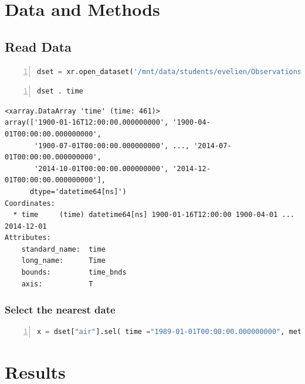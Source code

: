 \documentclass[10pt,parskip=half,
	toc=sectionentrywithdots,
	bibliography=totocnumbered,
	captions=tableheading,numbers=noendperiod]{scrartcl}
\begin{document}
\section{Data and Methods}\label{data-and-methods}

\subsection{Read Data}\label{read-data}

\begin{lstlisting}[language=Python,numbers=left,xleftmargin=20pt,xrightmargin=5pt,belowskip=5pt,aboveskip=5pt]
dset = xr.open_dataset('/mnt/data/students/evelien/Observations/air.mon.mean.seasonal.arctic.nc')
\end{lstlisting}

\begin{lstlisting}[language=Python,numbers=left,xleftmargin=20pt,xrightmargin=5pt,belowskip=5pt,aboveskip=5pt]
dset . time
\end{lstlisting}

\begin{lstlisting}[language={},postbreak={},numbers=none,xrightmargin=7pt,breakindent=0pt,aboveskip=5pt,belowskip=5pt]
<xarray.DataArray 'time' (time: 461)>
array(['1900-01-16T12:00:00.000000000', '1900-04-01T00:00:00.000000000',
       '1900-07-01T00:00:00.000000000', ..., '2014-07-01T00:00:00.000000000',
       '2014-10-01T00:00:00.000000000', '2014-12-01T00:00:00.000000000'],
      dtype='datetime64[ns]')
Coordinates:
  * time     (time) datetime64[ns] 1900-01-16T12:00:00 1900-04-01 ... 2014-12-01
Attributes:
    standard_name:  time
    long_name:      Time
    bounds:         time_bnds
    axis:           T
\end{lstlisting}

\subsubsection{Select the nearest date}\label{select-the-nearest-date}

\begin{lstlisting}[language=Python,numbers=left,xleftmargin=20pt,xrightmargin=5pt,belowskip=5pt,aboveskip=5pt]
x = dset["air"].sel( time ="1989-01-01T00:00:00.000000000", method = 'nearest')

\end{lstlisting}

\section{Results}\label{results}
\end{document}

